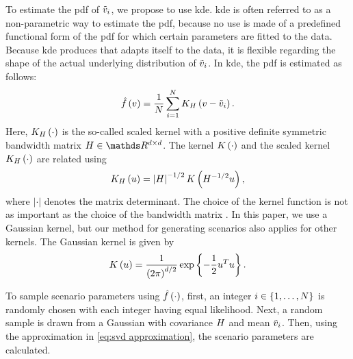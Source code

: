 To estimate the \ac{pdf} of $\tilde{v}_{i}$, we propose to use \ac{kde}.
\ac{kde} \autocite{rosenblatt1956remarks, parzen1962estimation} is often referred to as a non-parametric way to estimate the \ac{pdf}, because no use is made of a predefined functional form of the \ac{pdf} for which certain parameters are fitted to the data.
Because \ac{kde} produces  that adapts itself to the data, it is flexible regarding the shape of the actual underlying distribution of $\tilde{v}_{i}$.
In \ac{kde}, the \ac{pdf} is estimated as follows:
\begin{equation}
	\hat{f}\left( v \right) = \frac{1}{N} 
	\sum_{i=1}^{N} K_{H} \left( v - \tilde{v}_{i} \right).
\end{equation}
Here, $K_{H} \left( \cdot \right)$ is the so-called scaled kernel with a positive definite symmetric bandwidth matrix $\bandwidthmatrix \in \realnumbers^{\dimension \times \dimension}$.
The kernel $K \left( \cdot \right)$ and the scaled kernel $K_{H} \left( \cdot \right)$ are related using
\begin{equation}
	K_{H} \left( u \right) = \left|H\right|^{-1/2} K \left( H^{-1/2} u \right),
\end{equation}
where $|\cdot|$ denotes the matrix determinant. 
The choice of the kernel function is not as important as the choice of the bandwidth matrix \autocite{turlach1993bandwidthselection, duong2007ks}.
In this paper, we use a Gaussian kernel, but our method for generating scenarios also applies for other kernels. 
The Gaussian kernel is given by
\begin{equation}
	K \left( u \right) = \frac{1}{\left(2\pi\right)^{d/2}} \exp\left\{ -\frac{1}{2} u^T u \right\}.
\end{equation}

To sample scenario parameters using $\hat{f}\left( \cdot \right)$, first, an integer $i \in \{1,\ldots,N\}$ is randomly chosen with each integer having equal likelihood. 
Next, a random sample is drawn from a Gaussian with covariance $H$ and mean $\tilde{v}_{i}$.
Then, using the approximation in \cref{eq:svd approximation}, the scenario parameters are calculated.
